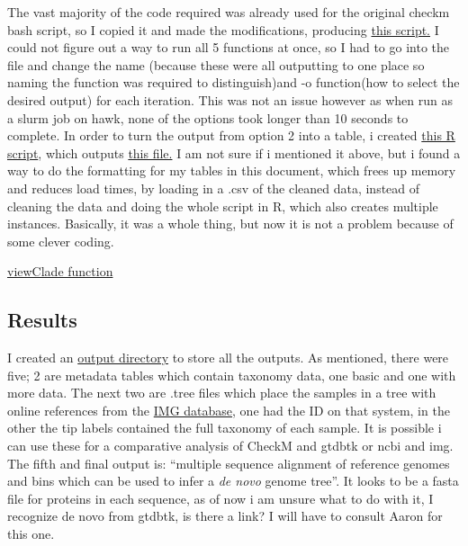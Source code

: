 \documentclass[
  letterpaper,
  DIV=11,
  numbers=noendperiod]{scrreprt}
\begin{document}
The vast majority of the code required was already used for the original
checkm bash script, so I copied it and made the modifications, producing
\href{https://github.com/tobiasnunn/tnunn_research/blob/3d90f340592d7081d3c6e172cbc786c8b85f368f/00_scripts/checkMtreeqa.sh}{this
script.} I could not figure out a way to run all 5 functions at once, so
I had to go into the file and change the name (because these were all
outputting to one place so naming the function was required to
distinguish)and -o function(how to select the desired output) for each
iteration. This was not an issue however as when run as a slurm job on
hawk, none of the options took longer than 10 seconds to complete. In
order to turn the output from option 2 into a table, i created
\href{https://github.com/tobiasnunn/tnunn_research/blob/20d1f52225ae83ba449e471cd260ce62f92c4ed9/00_scripts/CheckMtreeqa.R}{this
R script}, which outputs
\href{https://github.com/tobiasnunn/tnunn_research/blob/20d1f52225ae83ba449e471cd260ce62f92c4ed9/03_final_outputs/metadata_and_quality_tables/checkmtreeqa.csv}{this
file.} I am not sure if i mentioned it above, but i found a way to do
the formatting for my tables in this document, which frees up memory and
reduces load times, by loading in a .csv of the cleaned data, instead of
cleaning the data and doing the whole script in R, which also creates
multiple instances. Basically, it was a whole thing, but now it is not a
problem because of some clever coding.

\href{https://yulab-smu.top/treedata-book/chapter6.html?q=viewclade\#viewing-selected-clade}{viewClade
function}

\subsection{Results}\label{results-1}

I created an
\href{https://github.com/tobiasnunn/tnunn_research/tree/3d90f340592d7081d3c6e172cbc786c8b85f368f/02_middle-analysis_outputs/CheckM/checkmtreeqa}{output
directory} to store all the outputs. As mentioned, there were five; 2
are metadata tables which contain taxonomy data, one basic and one with
more data. The next two are .tree files which place the samples in a
tree with online references from the \href{https://img.jgi.doe.gov/}{IMG
database}, one had the ID on that system, in the other the tip labels
contained the full taxonomy of each sample. It is possible i can use
these for a comparative analysis of CheckM and gtdbtk or ncbi and img.
The fifth and final output is: ``multiple sequence alignment of
reference genomes and bins which can be used to infer a \emph{de novo}
genome tree''. It looks to be a fasta file for proteins in each
sequence, as of now i am unsure what to do with it, I recognize de novo
from gtdbtk, is there a link? I will have to consult Aaron for this one.
\end{document}
